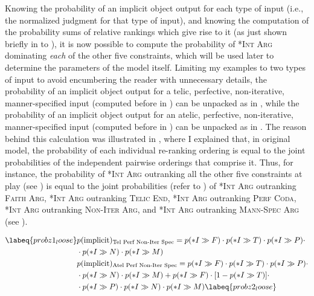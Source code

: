 Knowing the probability of an implicit object output for each type of input (i.e., the normalized judgment for that type of input), and knowing the computation of the probability sums of relative rankings which give rise to it (as just shown briefly in  to ), it is now possible to compute the probability of \textsc{*Int Arg} dominating \textit{each} of the other five constraints, which will be used later to determine the parameters of the model itself. Limiting my examples to two types of input to avoid encumbering the reader with unnecessary details, the probability of an implicit object output for a telic, perfective, non-iterative, manner-specified input (computed before in ) can be unpacked as in , while the probability of an implicit object output for an atelic, perfective, non-iterative, manner-specified input (computed before in ) can be unpacked as in . The reason behind this calculation was illustrated in , where I explained that, in  original model, the probability of each individual re-ranking ordering is equal to the joint probabilities of the independent pairwise orderings that comprise it. Thus, for instance, the probability of \textsc{*Int Arg} outranking all the other five constraints at play (see ) is equal to the joint probabilities (refer to ) of \textsc{*Int Arg} outranking \textsc{Faith Arg}, \textsc{*Int Arg} outranking \textsc{Telic End}, \textsc{*Int Arg} outranking \textsc{Perf Coda}, \textsc{*Int Arg} outranking \textsc{Non-Iter Arg}, and \textsc{*Int Arg} outranking \textsc{Mann-Spec Arg} (see ).

\begin{align}  \labeq{probz1_loose}
    & p(\text{implicit})\textsubscript{Tel Perf Non-Iter Spec} = p(*I \gg F) \cdot p(*I \gg T) \cdot p(*I \gg P) \cdot \nonumber \\ & \cdot p(*I \gg N) \cdot p(*I \gg M) \\
    & p(\text{implicit})\textsubscript{Atel Perf Non-Iter Spec} = p(*I \gg F) \cdot p(*I \gg T) \cdot p(*I \gg P) \cdot \nonumber \\ & \cdot p(*I \gg N) \cdot p(*I \gg M) + p(*I \gg F) \cdot [1 - p(*I \gg T)] \cdot \nonumber \\ & \cdot p(*I \gg P) \cdot p(*I \gg N) \cdot p(*I \gg M) \labeq{probz2_loose}
\end{align}

